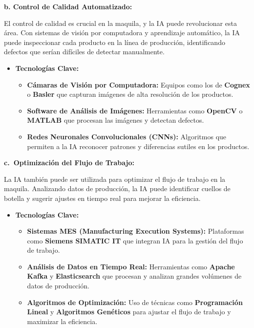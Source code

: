 \documentclass[
  letterpaper,
]{book}
\providecommand{\tightlist}{%
  \setlength{\itemsep}{0pt}\setlength{\parskip}{0pt}}\usepackage{longtable,booktabs,array}
\begin{document}
\textbf{b. Control de Calidad Automatizado:}

El control de calidad es crucial en la maquila, y la IA puede
revolucionar esta área. Con sistemas de visión por computadora y
aprendizaje automático, la IA puede inspeccionar cada producto en la
línea de producción, identificando defectos que serían difíciles de
detectar manualmente.

\begin{itemize}
\tightlist
\item
  \textbf{Tecnologías Clave:}

  \begin{itemize}
  \tightlist
  \item
    \textbf{Cámaras de Visión por Computadora:} Equipos como los de
    \textbf{Cognex} o \textbf{Basler} que capturan imágenes de alta
    resolución de los productos.
  \item
    \textbf{Software de Análisis de Imágenes:} Herramientas como
    \textbf{OpenCV} o \textbf{MATLAB} que procesan las imágenes y
    detectan defectos.
  \item
    \textbf{Redes Neuronales Convolucionales (CNNs):} Algoritmos que
    permiten a la IA reconocer patrones y diferencias sutiles en los
    productos.
  \end{itemize}
\end{itemize}

\textbf{c.~Optimización del Flujo de Trabajo:}

La IA también puede ser utilizada para optimizar el flujo de trabajo en
la maquila. Analizando datos de producción, la IA puede identificar
cuellos de botella y sugerir ajustes en tiempo real para mejorar la
eficiencia.

\begin{itemize}
\tightlist
\item
  \textbf{Tecnologías Clave:}

  \begin{itemize}
  \tightlist
  \item
    \textbf{Sistemas MES (Manufacturing Execution Systems):} Plataformas
    como \textbf{Siemens SIMATIC IT} que integran IA para la gestión del
    flujo de trabajo.
  \item
    \textbf{Análisis de Datos en Tiempo Real:} Herramientas como
    \textbf{Apache Kafka} y \textbf{Elasticsearch} que procesan y
    analizan grandes volúmenes de datos de producción.
  \item
    \textbf{Algoritmos de Optimización:} Uso de técnicas como
    \textbf{Programación Lineal} y \textbf{Algoritmos Genéticos} para
    ajustar el flujo de trabajo y maximizar la eficiencia.
  \end{itemize}
\end{itemize}
\end{document}
